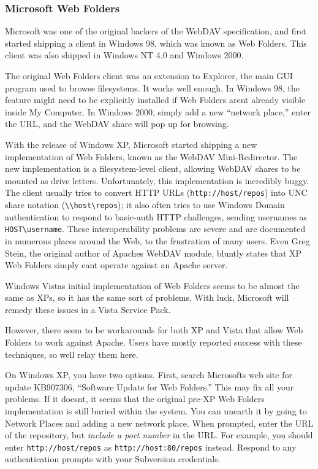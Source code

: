 \subsubsection{Microsoft Web
Folders}\label{svn.webdav.clients.file-explorer-extensions.windows}

Microsoft was one of the original backers of the WebDAV specification,
and first started shipping a client in Windows 98, which was known as
Web Folders. This client was also shipped in Windows NT 4.0 and Windows
2000.

The original Web Folders client was an extension to Explorer, the main
GUI program used to browse filesystems. It works well enough. In Windows
98, the feature might need to be explicitly installed if Web Folders
aren\textquotesingle t already visible inside My Computer. In Windows
2000, simply add a new ``network place,'' enter the URL, and the WebDAV
share will pop up for browsing.

With the release of Windows XP, Microsoft started shipping a new
implementation of Web Folders, known as the WebDAV Mini-Redirector. The
new implementation is a filesystem-level client, allowing WebDAV shares
to be mounted as drive letters. Unfortunately, this implementation is
incredibly buggy. The client usually tries to convert HTTP URLs
(\texttt{http://host/repos}) into UNC share notation
(\texttt{\textbackslash{}\textbackslash{}host\textbackslash{}repos}); it
also often tries to use Windows Domain authentication to respond to
basic-auth HTTP challenges, sending usernames as
\texttt{HOST\textbackslash{}username}. These interoperability problems
are severe and are documented in numerous places around the Web, to the
frustration of many users. Even Greg Stein, the original author of
Apache\textquotesingle s WebDAV module, bluntly states that XP Web
Folders simply can\textquotesingle t operate against an Apache server.

Windows Vista\textquotesingle s initial implementation of Web Folders
seems to be almost the same as XP\textquotesingle s, so it has the same
sort of problems. With luck, Microsoft will remedy these issues in a
Vista Service Pack.

However, there seem to be workarounds for both XP and Vista that allow
Web Folders to work against Apache. Users have mostly reported success
with these techniques, so we\textquotesingle ll relay them here.

On Windows XP, you have two options. First, search
Microsoft\textquotesingle s web site for update KB907306, ``Software
Update for Web Folders.'' This may fix all your problems. If it
doesn\textquotesingle t, it seems that the original pre-XP Web Folders
implementation is still buried within the system. You can unearth it by
going to Network Places and adding a new network place. When prompted,
enter the URL of the repository, but \emph{include a port number} in the
URL. For example, you should enter \texttt{http://host/repos} as
\texttt{http://host:80/repos} instead. Respond to any authentication
prompts with your Subversion credentials.

